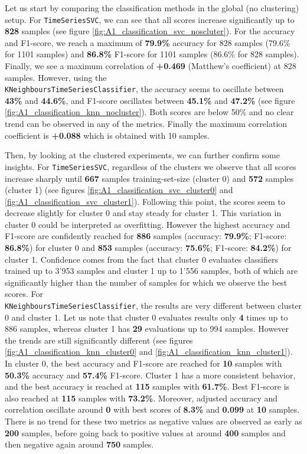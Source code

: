 \documentclass[sigplan,screen]{acmart}
\begin{document}
Let us start by comparing the classification methods in the global (no clustering) setup. For \texttt{TimeSeriesSVC}, we can see that all scores increase significantly up to \textbf{828} samples (see figure \ref{fig:A1_classification_svc_noscluter}). For the accuracy and F1-score, we reach a maximum of \textbf{79.9\%} accuracy for 828 samples (79.6\% for 1101 samples) and \textbf{86.8\%} F1-score for 1101 samples (86.6\% for 828 samples). Finally, we see a maximum correlation of \textbf{+0.469} (Matthew’s coefficient) at 828 samples.
However, using the \\ \texttt{KNeighboursTimeSeriesClassifier}, the accuracy seems to oscillate between \textbf{43\%} and \textbf{44.6\%}, and F1-score oscillates between \textbf{45.1\%} and \textbf{47.2\%} (see figure \ref{fig:A1_classification_knn_nocluster}). Both scores are below 50\% and no clear trend can be observed in any of the metrics. Finally the maximum correlation coefficient is \textbf{+0.088} which is obtained with 10 samples.

Then, by looking at the clustered experiments, we can further confirm some insights.
For \texttt{TimeSeriesSVC}, regardless of the clusters we observe that all scores increase sharply until \textbf{667} samples training-set-size (cluster 0) and \textbf{572} samples (cluster 1) (see figures \ref{fig:A1_classification_svc_cluster0} and \ref{fig:A1_classification_svc_cluster1}). Following this point, the scores seem to decrease slightly for cluster 0 and stay steady for cluster 1. This variation in cluster 0 could be interpreted as overfitting. However the highest accuracy and F1-score are confidently reached for \textbf{886} samples (accuracy: \textbf{79.9\%}; F1-score: \textbf{86.8\%}) for cluster 0 and \textbf{853} samples (accuracy: \textbf{75.6\%}; F1-score: \textbf{84.2\%}) for cluster 1. Confidence comes from the fact that cluster 0 evaluates classifiers trained up to 3’953 samples and cluster 1 up to 1’556 samples, both of which are significantly higher than the number of samples for which we observe the best scores.
For \\ \texttt{KNeighboursTimeSeriesClassifier}, the results are very different between cluster 0 and cluster 1. Let us note that cluster 0 evaluates results only \textbf{4} times up to 886 samples, whereas cluster 1 has \textbf{29} evaluations up to 994 samples. However the trends are still significantly different (see figures \ref{fig:A1_classification_knn_cluster0} and \ref{fig:A1_classification_knn_cluster1}). 
In cluster 0, the best accuracy and F1-score are reached for \textbf{10} samples with \textbf{50.3\%} accuracy and \textbf{57.4\%} F1-score.
Cluster 1 has a more consistent behavior, and the best accuracy is reached at \textbf{115} samples with \textbf{61.7\%}. Best F1-score is also reached at \textbf{115} samples with \textbf{73.2\%}. Moreover, adjusted accuracy and correlation oscillate around \textbf{0} with best scores of \textbf{8.3\%} and \textbf{0.099} at \textbf{10} samples. There is no trend for these two metrics as negative values are observed as early as \textbf{200} samples, before going back to positive values at around \textbf{400} samples and then negative again around \textbf{750} samples.
\end{document}
